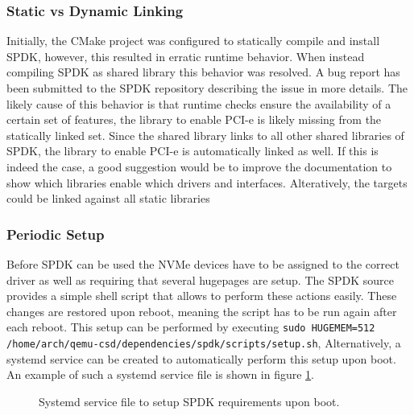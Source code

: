 \documentclass[conference]{IEEEtran}
\newcommand\bashstyle{
	\lstset{
		language=Bash,
		basicstyle=\ttm,
		showstringspaces=false,
		tabsize=2,
		aboveskip=0.2cm,
		belowskip=0.2cm,
		prebreak=\textbackslash,
		extendedchars=true,
		mathescape=false,
		linewidth=8.85cm,
		breaklines=true
	}
}
\newcommand\bashinline[1]{{\bashstyle\lstinline!#1!}}
\newcommand\bashexternal[2][]{{\bashstyle}}
\begin{document}

\subsubsection{Static vs Dynamic Linking}

Initially, the CMake project was configured to statically compile and install
SPDK, however, this resulted in erratic runtime behavior. When instead compiling
SPDK as shared library this behavior was resolved. A bug report has been
submitted to the SPDK repository describing the issue in more
details\cite{spdk-bug}. The likely cause of this behavior is that runtime checks
ensure the availability of a certain set of features, the library to enable
PCI-e is likely missing from the statically linked set. Since the shared
library links to all other shared libraries of SPDK, the library to enable
PCI-e is automatically linked as well. If this is indeed the case, a good
suggestion would be to improve the documentation to show which libraries enable
which drivers and interfaces. Alteratively, the targets could be linked against
all static libraries

\subsubsection{Periodic Setup}

Before SPDK can be used the NVMe devices have to be assigned to the correct
driver as well as requiring that several hugepages are setup. The SPDK source
provides a simple shell script that allows to perform these actions easily.
These  changes are restored upon reboot, meaning the script has to be run again
after each reboot. This setup can be performed by
executing\bashinline{sudo HUGEMEM=512 /home/arch/qemu-csd/dependencies/spdk/scripts/setup.sh},
Alternatively, a systemd service can be created to automatically perform this
setup upon boot. An example of such a systemd service file is shown in
figure \ref{fig:spdk-service}.

\begin{center}
	\begin{figure}[H]
		\bashexternal{resources/bash/spdk.service}
		\captionsetup{justification=centering}
		\caption{Systemd service file to setup SPDK requirements upon boot.}
		\label{fig:spdk-service}
	\end{figure}
\end{center}
\end{document}
